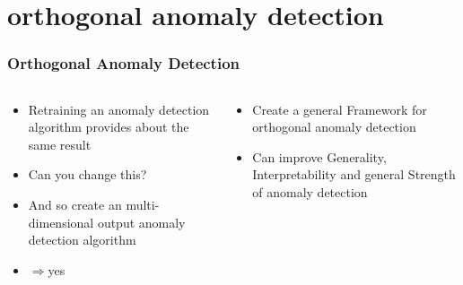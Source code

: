 \documentclass[hyperref={pdfpagelabels=false}]{beamer}
\begin{document}
\newpage
\section{orthogonal anomaly detection}\label{sec:orthogonal anomaly detection}



\begin{frame}[label=Orthogonal Anomaly Detection]
\frametitle{Orthogonal Anomaly Detection}
\begin{columns}[c] %
\begin{column}{0.48\textwidth}%
\begin{itemize}

    \item Retraining an anomaly detection algorithm provides about the same result

    \item Can you change this?

    \item And so create an multi-dimensional output anomaly detection algorithm

    \item $\Rightarrow$yes


\end{itemize}
\end{column}%
\hfill%
\begin{column}{0.48\textwidth}%
\begin{itemize}

    \item Create a general Framework for orthogonal anomaly detection

    \item Can improve Generality, Interpretability and general Strength of anomaly detection


\end{itemize}
\end{column}%
\hfill%
\end{columns}

\end{frame}
\end{document}
